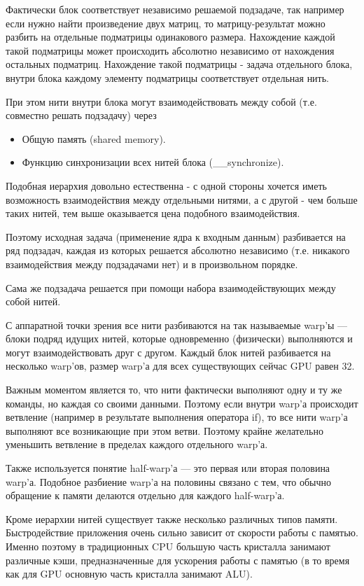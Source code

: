 Фактически блок соответствует независимо решаемой подзадаче, так например если нужно найти произведение двух матриц, то матрицу-результат можно разбить на отдельные подматрицы одинакового размера. Нахождение каждой такой подматрицы может происходить абсолютно независимо от нахождения остальных подматриц. Нахождение такой подматрицы - задача отдельного блока, внутри блока каждому элементу подматрицы соответствует отдельная нить.

При этом нити внутри блока могут взаимодействовать между собой (т.е. совместно решать подзадачу) через
\begin{itemize}
\item Общую память (shared memory).
\item Функцию синхронизации всех нитей блока (\_\_synchronize).
\end{itemize}

Подобная иерархия довольно естественна - с одной стороны хочется иметь возможность взаимодействия между отдельными нитями, а с другой - чем больше таких нитей, тем выше оказывается цена подобного взаимодействия.

Поэтому исходная задача (применение ядра к входным данным) разбивается на ряд подзадач, каждая из которых решается абсолютно независимо (т.е. никакого взаимодействия между подзадачами нет) и в произвольном порядке.

Сама же подзадача решается при помощи набора взаимодействующих между собой нитей.

С аппаратной точки зрения все нити разбиваются на так называемые warp'ы --- блоки подряд идущих нитей, которые одновременно (физически) выполняются и могут взаимодействовать друг с другом. Каждый блок нитей разбивается на несколько warp'ов, размер warp'а для всех существующих сейчас GPU равен 32.

Важным моментом является то, что нити фактически выполняют одну и ту же команды, но каждая со своими данными. Поэтому если внутри warp'а происходит ветвление (например в результате выполнения оператора if), то все нити warp'а выполняют все возникающие при этом ветви. Поэтому крайне желательно уменьшить ветвление в пределах каждого отдельного warp'а.

Также используется понятие half-warp'а --- это первая или вторая половина warp'а. Подобное разбиение warp'а на половины связано с тем, что обычно обращение к памяти делаются отдельно для каждого half-warp'а.

Кроме иерархии нитей существует также несколько различных типов памяти. Быстродействие приложения очень сильно зависит от скорости работы с памятью. Именно поэтому в традиционных CPU большую часть кристалла занимают различные кэши, предназначенные для ускорения работы с памятью (в то время как для GPU основную часть кристалла занимают ALU).

